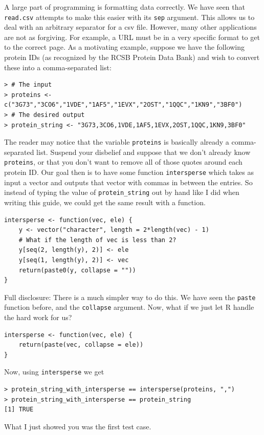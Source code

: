 \documentclass[12pt]{article}
\theoremstyle{remark}
\begin{document}
A large part of programming is formatting data correctly. We have seen that \verb|read.csv| attempts to make this easier with its \verb|sep| argument. This allows us to deal with an arbitrary separator for a csv file. However, many other applications are not as forgiving. For example, a URL must be in a very specific format to get to the correct page. As a motivating example, suppose we have the following protein IDs (as recognized by the RCSB Protein Data Bank) and wish to convert these into a comma-separated list:

\begin{Verbatim}[frame=single, fontsize=\small]
> # The input
> proteins <- c("3G73","3CO6","1VDE","1AF5","1EVX","2OST","1QQC","1KN9","3BF0")
> # The desired output
> protein_string <- "3G73,3CO6,1VDE,1AF5,1EVX,2OST,1QQC,1KN9,3BF0"
\end{Verbatim}

The reader may notice that the variable \verb|proteins| is basically already a comma-separated list. Suspend your disbelief and suppose that we don't already know \verb|proteins|, or that you don't want to remove all of those quotes around each protein ID. Our goal then is to have some function \verb|intersperse| which takes as input a vector and outputs that vector with commas in between the entries. So instead of typing the value of \verb|protein_string| out by hand like I did when writing this guide, we could get the same result with a function.


\begin{Verbatim}[frame=single, fontsize=\small]
intersperse <- function(vec, ele) {
	y <- vector("character", length = 2*length(vec) - 1)
	# What if the length of vec is less than 2?
	y[seq(2, length(y), 2)] <- ele
	y[seq(1, length(y), 2)] <- vec
	return(paste0(y, collapse = ""))
}
\end{Verbatim}

Full disclosure: There is a much simpler way to do this. We have seen the \verb|paste| function before, and the \verb|collapse| argument. Now, what if we just let R handle the hard work for us?

\begin{Verbatim}[frame=single, fontsize=\small]
intersperse <- function(vec, ele) {
	return(paste(vec, collapse = ele))
}
\end{Verbatim}

Now, using \verb|intersperse| we get
\begin{verbatim}
> protein_string_with_intersperse == intersperse(proteins, ",")
> protein_string_with_intersperse == protein_string
[1] TRUE
\end{verbatim}
What I just showed you was the first test case.
\end{document}
